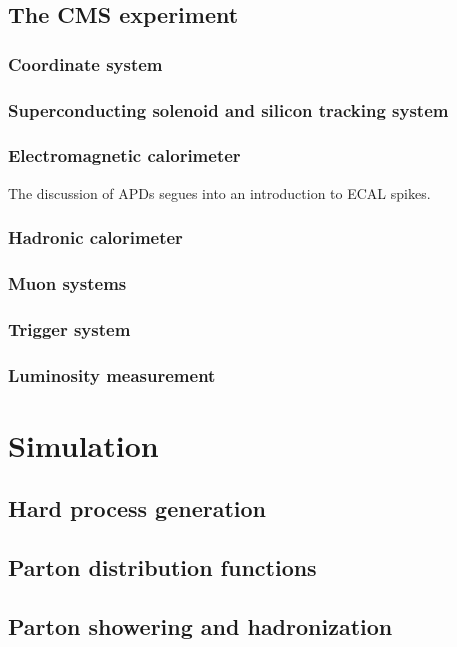 \documentclass[oneside, letterpaper, 12pt, oldfontcommands]{memoir}
\begin{document}
\section{The CMS experiment} \label{sec:LHCCMS_CMS}
\subsection{Coordinate system} \label{sec:LHCCMS_CMS_coordinates}
\subsection{Superconducting solenoid and silicon tracking system} \label{sec:LHCCMS_CMS_magnet_tracker}
\subsection{Electromagnetic calorimeter} \label{sec:LHCCMS_CMS_ECAL}
The discussion of APDs segues into an introduction to ECAL spikes.
\subsection{Hadronic calorimeter} \label{sec:LHCCMS_CMS_HCAL}
\subsection{Muon systems} \label{sec:LHCCMS_CMS_muon}
\subsection{Trigger system} \label{sec:LHCCMS_CMS_trigger}
\subsection{Luminosity measurement} \label{sec:LHCCMS_CMS_lumi}

\chapter{Simulation} \label{chap:simulation}
\section{Hard process generation} \label{sec:simulation_hard_process}
\section{Parton distribution functions} \label{sec:simulation_pdf}
\section{Parton showering and hadronization} \label{sec:simulation_parton_shower_hadronization}
\end{document}
